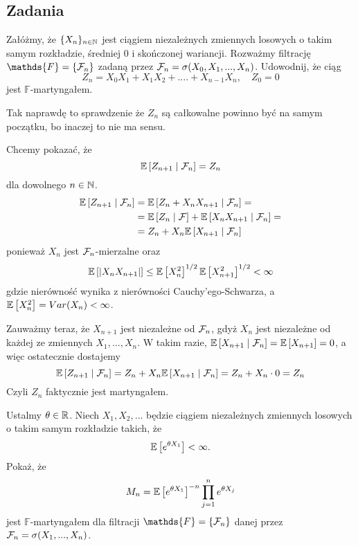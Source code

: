 \subsection{Zadania}

\setcounter{problem}{0}

\begin{problem}
  Załóżmy, że $\{X_n\}_{n\in\operatorname{\mathbb{N}}}$ jest ciągiem niezależnych zmiennych losowych o takim samym rozkładzie, średniej $0$ i skończonej wariancji. Rozważmy filtrację $\mathds{F}=\{\set{F}_n\}$ zadaną przez $\mathcal{F}_n=\sigma(X_0,X_1,...,X_n)$. Udowodnij, że ciąg
  $$Z_n=X_0X_1+X_1X_2+....+X_{n-1}X_n, \quad Z_0=0$$
  jest $\mathds{F}$-martyngałem.
\end{problem}

\begin{solution}
  {\color{red}Tak naprawdę to sprawdzenie że $Z_n$ są całkowalne powinno być na samym początku, bo inaczej to nie ma sensu.}

  Chcemy pokazać, że
  $$\expected{Z_{n+1}}{\set{F}_{n}}=Z_n$$
  dla dowolnego $n\in\operatorname{\mathbb{N}}$.
  \begin{align*}
    \expected{Z_{n+1}}{\set{F}_n}&=\expected{Z_n+X_nX_{n+1}}{\set{F}_n}=\\ 
                                 &=\expected{Z_n}{\set{F}}+\expected{X_nX_{n+1}}{\set{F}_n}=\\ 
                                 &=Z_n+X_n\expected{X_{n+1}}{\set{F}_n}
  \end{align*}
  ponieważ $X_n$ jest $\mathcal{F}_n$-mierzalne oraz
  $$\expected{|X_nX_{n+1}|}\leq\expected{X_n^2}^{1/2}\expected{X_{n+1}^2}^{1/2}<\infty$$
  gdzie nierówność wynika z nierówności Cauchy'ego-Schwarza, a $\expected{X_n^2}=Var(X_n)<\infty$.

  Zauważmy teraz, że $X_{n+1}$ jest niezależne od $\mathcal{F}_n$, gdyż $X_n$ jest niezależne od każdej ze zmiennych $X_1,...,X_n$. W takim razie, $\expected{X_{n+1}}{\set{F}_n}=\expected{X_{n+1}}=0$, a więc ostatecznie dostajemy
  $$\expected{Z_{n+1}}{\set{F}_n}=Z_n+X_n\expected{X_{n+1}}{\set{F}_n}=Z_n+X_n\cdot 0=Z_n$$
  Czyli $Z_n$ faktycznie jest martyngałem.
\end{solution}

\begin{problem}
  Ustalmy $\theta\in\operatorname{\mathbb{R}}$. Niech $X_1,X_2,...$ będzie ciągiem niezależnych zmiennych losowych o takim samym rozkładzie takich, że 
  $$\expected{e^{\theta X_1}}<\infty.$$
  Pokaż, że 
  $$M_n=\expected{e^{\theta X_1}}^{-n}\prod_{j=1}^ne^{\theta X_j}$$
  jest $\mathds{F}$-martyngałem dla filtracji $\mathds{F}=\{\set{F}_n\}$ danej przez $\mathcal{F}_n=\sigma(X_1,...,X_n)$.
\end{problem}

